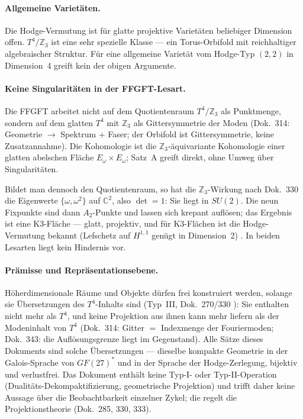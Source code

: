 \paragraph{Allgemeine Varietäten.}
Die Hodge-Vermutung ist für glatte projektive Varietäten beliebiger Dimension
offen. $T^4/\mathbb{Z}_3$ ist eine sehr spezielle Klasse — ein Torus-Orbifold
mit reichhaltiger algebraischer Struktur. Für eine allgemeine Varietät vom
Hodge-Typ $(2,2)$ in Dimension~4 greift kein der obigen Argumente.

\paragraph{Keine Singularitäten in der FFGFT-Lesart.}
Die FFGFT arbeitet nicht auf dem Quotientenraum $T^4/\mathbb{Z}_3$ als
Punktmenge, sondern auf dem glatten $T^4$ mit $\mathbb{Z}_3$ als
Gittersymmetrie der Moden (Dok.~314: Geometrie $\to$ Spektrum + Faser;
der Orbifold ist Gittersymmetrie, keine Zusatzannahme). Die Kohomologie ist
die $\mathbb{Z}_3$-äquivariante Kohomologie einer glatten abelschen Fläche
$E_\omega\times E_\omega$; Satz~A greift direkt, ohne Umweg über
Singularitäten. \BM

Bildet man dennoch den Quotientenraum, so hat die $\mathbb{Z}_3$-Wirkung
nach Dok.~330 die Eigenwerte $\{\omega,\omega^2\}$ auf $\mathbb{C}^2$, also
$\det=1$: Sie liegt in $SU(2)$. Die neun Fixpunkte sind dann
$A_2$-Punkte und lassen sich krepant auflösen; das Ergebnis ist eine
K3-Fläche --- glatt, projektiv, und für K3-Flächen ist die Hodge-Vermutung
bekannt (Lefschetz auf $H^{1,1}$ genügt in Dimension~2) \EM. In beiden
Lesarten liegt kein Hindernis vor.

\paragraph{Prämisse und Repräsentationsebene.}
Höherdimensionale Räume und Objekte dürfen frei konstruiert werden, solange
sie Übersetzungen des $T^4$-Inhalts sind (Typ~III, Dok.~270/330 \KM): Sie
enthalten nicht mehr als $T^4$, und keine Projektion aus ihnen kann mehr
liefern als der Modeninhalt von $T^4$ (Dok.~314: Gitter $=$ Indexmenge der
Fouriermoden; Dok.~343: die Auflösungsgrenze liegt im Gegenstand). Alle
Sätze dieses Dokuments sind solche Übersetzungen --- dieselbe kompakte
Geometrie in der Galois-Sprache von $GF(27)^*$ und in der Sprache der
Hodge-Zerlegung, bijektiv und verlustfrei. Das Dokument enthält keine
Typ-I- oder Typ-II-Operation (Dualitäts-Dekompaktifizierung, geometrische
Projektion) und trifft daher keine Aussage über die Beobachtbarkeit
einzelner Zykel; die regelt die Projektionstheorie (Dok.~285, 330, 333).

